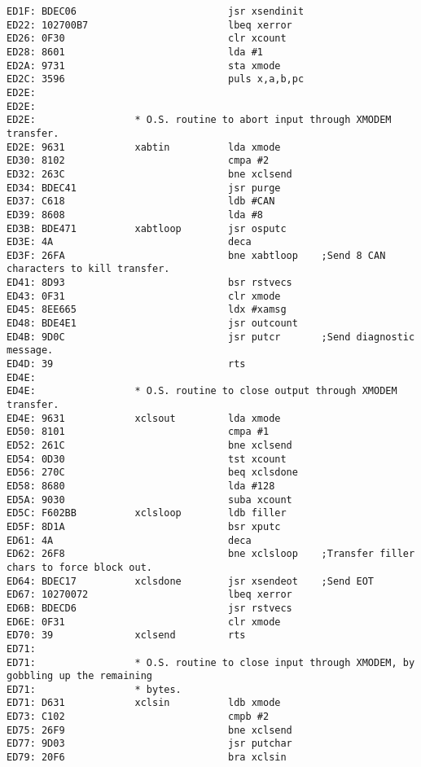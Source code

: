 {\begin{verbatim}
ED1F: BDEC06                          jsr xsendinit
ED22: 102700B7                        lbeq xerror
ED26: 0F30                            clr xcount
ED28: 8601                            lda #1
ED2A: 9731                            sta xmode
ED2C: 3596                            puls x,a,b,pc
ED2E:                                 
ED2E:                 
ED2E:                 * O.S. routine to abort input through XMODEM transfer.
ED2E: 9631            xabtin          lda xmode
ED30: 8102                            cmpa #2
ED32: 263C                            bne xclsend
ED34: BDEC41                          jsr purge
ED37: C618                            ldb #CAN
ED39: 8608                            lda #8
ED3B: BDE471          xabtloop        jsr osputc
ED3E: 4A                              deca
ED3F: 26FA                            bne xabtloop    ;Send 8 CAN characters to kill transfer.
ED41: 8D93                            bsr rstvecs
ED43: 0F31                            clr xmode
ED45: 8EE665                          ldx #xamsg
ED48: BDE4E1                          jsr outcount
ED4B: 9D0C                            jsr putcr       ;Send diagnostic message.
ED4D: 39                              rts             
ED4E:                 
ED4E:                 * O.S. routine to close output through XMODEM transfer.
ED4E: 9631            xclsout         lda xmode 
ED50: 8101                            cmpa #1
ED52: 261C                            bne xclsend
ED54: 0D30                            tst xcount
ED56: 270C                            beq xclsdone
ED58: 8680                            lda #128
ED5A: 9030                            suba xcount
ED5C: F602BB          xclsloop        ldb filler
ED5F: 8D1A                            bsr xputc   
ED61: 4A                              deca
ED62: 26F8                            bne xclsloop    ;Transfer filler chars to force block out.
ED64: BDEC17          xclsdone        jsr xsendeot    ;Send EOT
ED67: 10270072                        lbeq xerror
ED6B: BDECD6                          jsr rstvecs
ED6E: 0F31                            clr xmode                                               
ED70: 39              xclsend         rts     
ED71:                 
ED71:                 * O.S. routine to close input through XMODEM, by gobbling up the remaining
ED71:                 * bytes.
ED71: D631            xclsin          ldb xmode
ED73: C102                            cmpb #2
ED75: 26F9                            bne xclsend
ED77: 9D03                            jsr putchar
ED79: 20F6                            bra xclsin

\end{verbatim}}
